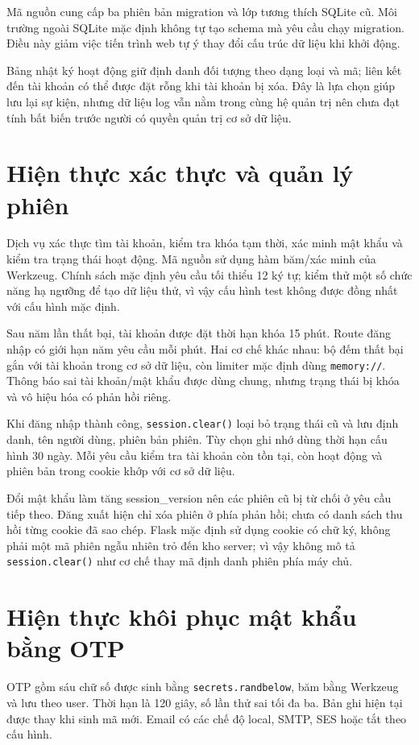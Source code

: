 Mã nguồn cung cấp ba phiên bản migration và lớp tương thích SQLite cũ. Môi trường ngoài SQLite mặc định không tự tạo schema mà yêu cầu chạy migration. Điều này giảm việc tiến trình web tự ý thay đổi cấu trúc dữ liệu khi khởi động.

Bảng nhật ký hoạt động giữ định danh đối tượng theo dạng loại và mã; liên kết đến tài khoản có thể được đặt rỗng khi tài khoản bị xóa. Đây là lựa chọn giúp lưu lại sự kiện, nhưng dữ liệu log vẫn nằm trong cùng hệ quản trị nên chưa đạt tính bất biến trước người có quyền quản trị cơ sở dữ liệu.

\section{Hiện thực xác thực và quản lý phiên}
Dịch vụ xác thực tìm tài khoản, kiểm tra khóa tạm thời, xác minh mật khẩu và kiểm tra trạng thái hoạt động. Mã nguồn sử dụng hàm băm/xác minh của Werkzeug. Chính sách mặc định yêu cầu tối thiểu 12 ký tự; kiểm thử một số chức năng hạ ngưỡng để tạo dữ liệu thử, vì vậy cấu hình test không được đồng nhất với cấu hình mặc định.

Sau năm lần thất bại, tài khoản được đặt thời hạn khóa 15 phút. Route đăng nhập có giới hạn năm yêu cầu mỗi phút. Hai cơ chế khác nhau: bộ đếm thất bại gắn với tài khoản trong cơ sở dữ liệu, còn limiter mặc định dùng \texttt{memory://}. Thông báo sai tài khoản/mật khẩu được dùng chung, nhưng trạng thái bị khóa và vô hiệu hóa có phản hồi riêng.

Khi đăng nhập thành công, \texttt{session.clear()} loại bỏ trạng thái cũ và lưu định danh, tên người dùng, phiên bản phiên. Tùy chọn ghi nhớ dùng thời hạn cấu hình 30 ngày. Mỗi yêu cầu kiểm tra tài khoản còn tồn tại, còn hoạt động và phiên bản trong cookie khớp với cơ sở dữ liệu.

Đổi mật khẩu làm tăng session\_version nên các phiên cũ bị từ chối ở yêu cầu tiếp theo. Đăng xuất hiện chỉ xóa phiên ở phía phản hồi; chưa có danh sách thu hồi từng cookie đã sao chép. Flask mặc định sử dụng cookie có chữ ký, không phải một mã phiên ngẫu nhiên trỏ đến kho server; vì vậy không mô tả \texttt{session.clear()} như cơ chế thay mã định danh phiên phía máy chủ.

\section{Hiện thực khôi phục mật khẩu bằng OTP}
OTP gồm sáu chữ số được sinh bằng \texttt{secrets.randbelow}, băm bằng Werkzeug và lưu theo user. Thời hạn là 120 giây, số lần thử sai tối đa ba. Bản ghi hiện tại được thay khi sinh mã mới. Email có các chế độ local, SMTP, SES hoặc tắt theo cấu hình.

